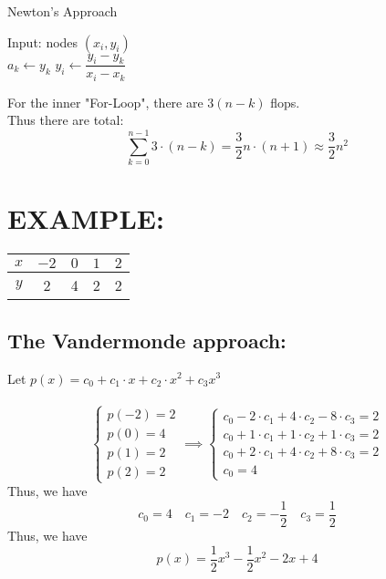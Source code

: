 \documentclass [9 pt]{article}
\theoremstyle{definition}
\begin{document}
\newpage

\begin{algorithm}
\caption{Newton's Approach}
\begin{algorithmic}[1]
\State Input: nodes $(x_i, y_i)$\\

	\State $a_k \gets y_k$
		\State $y_i \gets \dfrac{y_i - y_k}{x_i - x_k} $
	\EndFor

\EndFor




\end{algorithmic}
\end{algorithm}

For the inner "For-Loop", there are $3(n - k)$ flops.\\
Thus there are total:
$$ \sum_{k = 0}^{n - 1} 3\cdot(n - k) = \dfrac{3}{2} n \cdot (n+1) \approx \dfrac{3}{2}n^2 $$



\section*{EXAMPLE:}

\begin{center}
\begin{tabular}{ c|cccc } 
	
 $x$ & $-2$ &$0$ &$1$ &$2$\\ 
 \hline
 $y$ & 2 &4 & 2 &2 \\ 

\end{tabular}
\end{center}

\subsection*{The Vandermonde approach:}
Let $p(x) = c_0 + c_1 \cdot x + c_2 \cdot x^2 + c_3 x^3$\\
\\
$$ \begin{cases}
	p(-2) = 2\\
	p(0) = 4\\
	p(1) = 2\\
	p(2) = 2
\end{cases} \implies \begin{cases}
	c_0 - 2\cdot c_1 + 4\cdot c_2 - 8\cdot c_3 = 2\\
	c_0 + 1\cdot c_1 + 1\cdot c_2 + 1\cdot c_3 = 2\\
	c_0 + 2\cdot c_1 + 4\cdot c_2 + 8\cdot c_3 = 2\\
	c_0 = 4
\end{cases} $$
Thus, we have 
$$c_0 = 4 \quad c_1 = - 2 \quad c_2 = -\dfrac{1}{2} \quad c_3 =  \dfrac{1}{2}$$
Thus, we have $$p(x) =  \dfrac{1}{2}x^3 - \dfrac{1}{2}x^2 - 2x + 4 $$
\end{document}
